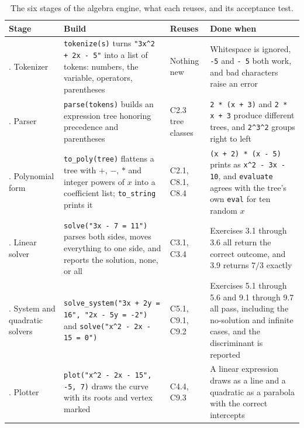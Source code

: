 \begin{table}[H]
\centering
\footnotesize
\renewcommand{\arraystretch}{1.25}
\begin{tabularx}{\textwidth}{@{}>{\raggedright\arraybackslash}p{0.85in} >{\raggedright\arraybackslash}X >{\raggedright\arraybackslash}p{0.9in} >{\raggedright\arraybackslash}X@{}}
\toprule
\textbf{Stage} & \textbf{Build} & \textbf{Reuses} & \textbf{Done when} \\
\midrule
1. Tokenizer & \texttt{tokenize(s)} turns \texttt{"3x\textasciicircum{}2 + 2x - 5"} into a list of tokens: numbers, the variable, operators, parentheses & Nothing new & Whitespace is ignored, \texttt{-5} and \texttt{- 5} both work, and bad characters raise an error \\
2. Parser & \texttt{parse(tokens)} builds an expression tree honoring precedence and parentheses & C2.3 tree classes & \texttt{2 * (x + 3)} and \texttt{2 * x + 3} produce different trees, and \texttt{2\textasciicircum{}3\textasciicircum{}2} groups right to left \\
3. Polynomial form & \texttt{to\_poly(tree)} flattens a tree with $+$, $-$, $*$ and integer powers of $x$ into a coefficient list; \texttt{to\_string} prints it & C2.1, C8.1, C8.4 & \texttt{(x + 2) * (x - 5)} prints as \texttt{x\textasciicircum{}2 - 3x - 10}, and \texttt{evaluate} agrees with the tree's own \texttt{eval} for ten random $x$ \\
4. Linear solver & \texttt{solve("3x - 7 = 11")} parses both sides, moves everything to one side, and reports the solution, none, or all & C3.1, C3.4 & Exercises 3.1 through 3.6 all return the correct outcome, and 3.9 returns $7/3$ exactly \\
5. System and quadratic solvers & \texttt{solve\_system("3x + 2y = 16", "2x - 5y = -2")} and \texttt{solve("x\textasciicircum{}2 - 2x - 15 = 0")} & C5.1, C9.1, C9.2 & Exercises 5.1 through 5.6 and 9.1 through 9.7 all pass, including the no-solution and infinite cases, and the discriminant is reported \\
6. Plotter & \texttt{plot("x\textasciicircum{}2 - 2x - 15", -5, 7)} draws the curve with its roots and vertex marked & C4.4, C9.3 & A linear expression draws as a line and a quadratic as a parabola with the correct intercepts \\
\bottomrule
\end{tabularx}
\caption{The six stages of the algebra engine, what each reuses, and its acceptance test.}
\end{table}

